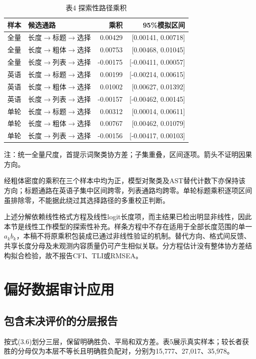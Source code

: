 \documentclass[UTF8,11pt,a4paper,fontset=windows]{ctexart}
\numberwithin{equation}{section}
\begin{document}
\begin{table}[htbp]\centering\small\caption{表4 探索性路径乘积}\label{tab:paths}
\begin{tabular}{llrr}\toprule
样本 & 候选通路 & 乘积 & 95\%模拟区间\\\midrule
全量 & 长度$\to$标题$\to$选择 & 0.00429 & [0.00141, 0.00718]\\
全量 & 长度$\to$粗体$\to$选择 & 0.00753 & [0.00468, 0.01045]\\
全量 & 长度$\to$列表$\to$选择 & -0.00175 & [-0.00411, 0.00057]\\
英语 & 长度$\to$标题$\to$选择 & 0.00199 & [-0.00214, 0.00615]\\
英语 & 长度$\to$粗体$\to$选择 & 0.01002 & [0.00627, 0.01392]\\
英语 & 长度$\to$列表$\to$选择 & -0.00157 & [-0.00462, 0.00145]\\
单轮 & 长度$\to$标题$\to$选择 & 0.00312 & [0.00014, 0.00611]\\
单轮 & 长度$\to$粗体$\to$选择 & 0.00767 & [0.00462, 0.01079]\\
单轮 & 长度$\to$列表$\to$选择 & -0.00156 & [-0.00417, 0.00103]\\\bottomrule\end{tabular}
\par\smallskip\footnotesize 注：统一全量尺度，首提示词聚类协方差；子集重叠，区间逐项。箭头不证明因果方向。
\end{table}

经粗体密度的乘积在三个样本中均为正，模型对聚类及AST替代计数下亦保持该方向；标题通路在英语子集中区间跨零，列表通路均跨零。单轮标题乘积逐项区间虽排除零，不能据此绕过其选择路径的多重校正判断。

上述分解依赖线性格式方程及线性logit长度项，而主结果已检出明显非线性，因此本节是线性工作模型的探索性补充。样条方程中不存在适用于全部长度范围的单一$a_kb_k$，本稿不将原乘积包装成已通过非线性验证的机制。替代方向、格式间反馈、共享长度分母及未观测内容质量仍可产生相似关联。分方程估计没有整体协方差结构拟合检验，故不报告CFI、TLI或RMSEA。


\section{偏好数据审计应用}
\subsection{包含未决评价的分层报告}
按式(3.6)划分三层，保留明确胜负、平局和双方差。表5展示真实样本；较长者获胜的分母仅为本层不等长且明确胜负配对，分别为15,777、27,017、35,978。
\end{document}
